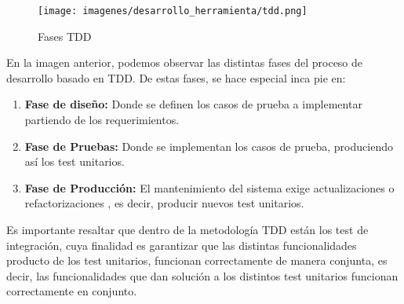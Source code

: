 \documentclass[a4paper,11pt]{book}
\begin{document}
\begin{figure}[H] 
\centering 
\texttt{[image: imagenes/desarrollo\_herramienta/tdd.png]}
\caption{ Fases TDD\cite{tdd2}  }  
\end{figure} 
	


En la imagen anterior, podemos observar las distintas fases del proceso de desarrollo basado en TDD. De estas fases, se hace especial inca pie en:

\begin{enumerate}
\item \textbf{Fase de diseño:} Donde se definen los casos de prueba a implementar partiendo de los requerimientos.

\item \textbf{Fase de Pruebas:} Donde se implementan los casos de prueba, produciendo así los test unitarios.

\item \textbf{Fase de Producción:} El mantenimiento del sistema exige actualizaciones o refactorizaciones , es decir, producir nuevos test unitarios. 
\end{enumerate}

	 

Es importante resaltar que dentro de la metodología TDD están los test de integración, cuya finalidad es garantizar que las distintas funcionalidades producto de los test unitarios, funcionan correctamente de manera conjunta, es decir, las funcionalidades que dan solución a los  distintos test unitarios funcionan correctamente en conjunto. 
\end{document}

